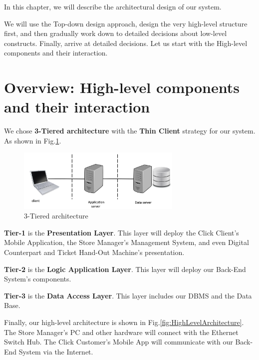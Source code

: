 \documentclass[a4paper,12pt]{report}
\begin{document}
In this chapter, we will describe the architectural design of our system.

We will use the Top-down design approach, design the very high-level structure first,
and then gradually work down to detailed decisions about low-level constructs.
Finally, arrive at detailed decisions.\cite{SlidesSE2}
Let us start with the High-level components and their interaction.


\section{Overview: High-level components and their interaction}\label{sec:ArchitectureOverview}

We chose \textbf{3-Tiered architecture} with the \textbf{Thin Client} strategy for our system.
As shown in Fig.\ref{fig:ThreeTieredArchitecture}.\cite{SistemiInformativi}

\begin{figure}[H]
	\centering
	\includegraphics[width=0.7\textwidth]{ThreeTiered}
	\caption{3-Tiered architecture}
	\centering
	\label{fig:ThreeTieredArchitecture}
\end{figure}


\textbf{Tier-1} is the \textbf{Presentation Layer}.
This layer will deploy the Click Client's Mobile Application,
the Store Manager's Management System,
and even Digital Counterpart and Ticket Hand-Out Machine's presentation.

\textbf{Tier-2} is the \textbf{Logic Application Layer}.
This layer will deploy our Back-End System's components.

\textbf{Tier-3} is the \textbf{Data Access Layer}.
This layer includes our DBMS and the Data Base.

Finally, our high-level architecture is shown in Fig.\ref{fig:HighLevelArchitecture}.
The Store Manager's PC and other hardware will connect with the Ethernet Switch Hub.
The Click Customer's Mobile App will communicate with our Back-End System via the Internet.
\end{document}
